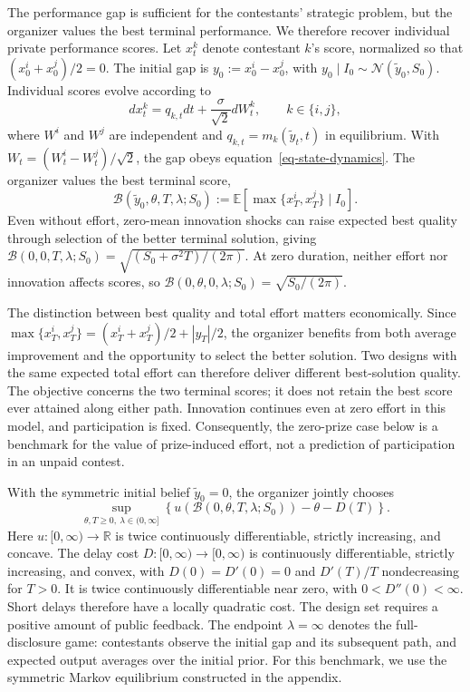 \documentclass[mnsc]{informs3}
\begin{document}
The performance gap is sufficient for the contestants' strategic problem, but the organizer values the best terminal performance. We therefore recover individual private performance scores. Let $x_t^k$ denote contestant $k$'s score, normalized so that $(x_0^i+x_0^j)/2=0$. The initial gap is $y_0:=x_0^i-x_0^j$, with $y_0\mid I_0\sim\mathcal N(\tilde y_0,S_0)$.
Individual scores evolve according to
\begin{equation}\label{eq-individual-output-dynamics}
dx_t^k=q_{k,t}dt+\frac{\sigma}{\sqrt2}dW_t^k,
\qquad k\in\{i,j\},
\end{equation}
where $W^i$ and $W^j$ are independent and $q_{k,t}=m_k(\tilde y_t,t)$ in equilibrium. With $W_t=(W_t^i-W_t^j)/\sqrt2$, the gap obeys equation~\eqref{eq-state-dynamics}. The organizer values the best terminal score,
\[
\mathcal B(\tilde y_0,\theta,T,\lambda;S_0)
:=\mathbb E[\max\{x_T^i,x_T^j\}\mid I_0].
\]
Even without effort, zero-mean innovation shocks can raise expected best quality through selection of the better terminal solution, giving $\mathcal B(0,0,T,\lambda;S_0)=\sqrt{(S_0+\sigma^2T)/(2\pi)}$. At zero duration, neither effort nor innovation affects scores, so $\mathcal B(0,\theta,0,\lambda;S_0)=\sqrt{S_0/(2\pi)}$.

The distinction between best quality and total effort matters economically. Since $\max\{x_T^i,x_T^j\}=(x_T^i+x_T^j)/2+|y_T|/2$, the organizer benefits from both average improvement and the opportunity to select the better solution. Two designs with the same expected total effort can therefore deliver different best-solution quality. The objective concerns the two terminal scores; it does not retain the best score ever attained along either path. Innovation continues even at zero effort in this model, and participation is fixed. Consequently, the zero-prize case below is a benchmark for the value of prize-induced effort, not a prediction of participation in an unpaid contest.



With the symmetric initial belief $\tilde y_0=0$, the organizer jointly chooses
\begin{equation}\label{eq-designer-best-output-objective}
\sup_{\theta,T\geq0,\ \lambda\in(0,\infty]}
\left\{u\!\left(\mathcal B(0,\theta,T,\lambda;S_0)\right)
-\theta-D(T)\right\}.
\end{equation}
Here $u:[0,\infty)\to\mathbb R$ is twice continuously differentiable, strictly increasing, and concave. The delay cost $D:[0,\infty)\to[0,\infty)$ is continuously differentiable, strictly increasing, and convex, with $D(0)=D'(0)=0$ and $D'(T)/T$ nondecreasing for $T>0$. It is twice continuously differentiable near zero, with $0<D''(0)<\infty$. Short delays therefore have a locally quadratic cost.
The design set requires a positive amount of public feedback. The endpoint $\lambda=\infty$ denotes the full-disclosure game: contestants observe the initial gap and its subsequent path, and expected output averages over the initial prior. For this benchmark, we use the symmetric Markov equilibrium constructed in the appendix.
\end{document}
